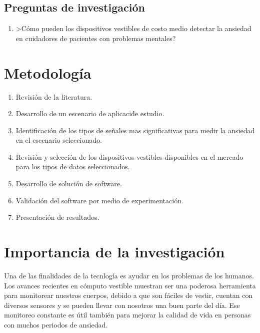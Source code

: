 \documentclass[letterpaper,12pt]{cicese}
\begin{document}
			\section{Preguntas de investigaci\'on}
				\begin{enumerate}
					\item >C\'omo pueden los dispositivos vestibles de costo medio detectar la ansiedad en cuidadores de pacientes con problemas mentales?
				\end{enumerate}
		\chapter{Metodolog\'ia}
				\begin{enumerate}
					\item Revisi\'on de la literatura.
					\item Desarrollo de un escenario de aplicaci\'de estudio.
					\item Identificaci\'on de los tipos de se\~nales mas significativas para medir la ansiedad en el escenario seleccionado.
					\item Revisi\'on y selecci\'on de los dispositivos vestibles disponibles en el mercado para los tipos de datos seleccionados.
					\item Desarrollo de soluci\'on de software.
					\item Validaci\'on del software por medio de experimentaci\'on.
					\item Presentaci\'on de resultados.
				\end{enumerate}
		\chapter{Importancia de la investigaci\'on}
				Una de las finalidades de la tecnlog\'ia es ayudar en los problemas de los humanos. Los avances recientes en c\'omputo vestible muestran
				ser una poderosa herramienta para monitorear nuestros cuerpos, debido a que son f\'aciles de vestir, cuentan con diversos sensores y se pueden
				llevar con nosotros una buen parte del d\'ia. Ese monitoreo constante es \'util tambi\'en para mejorar la calidad de vida en personas con muchos periodos de ansiedad. %
				
\end{document}
